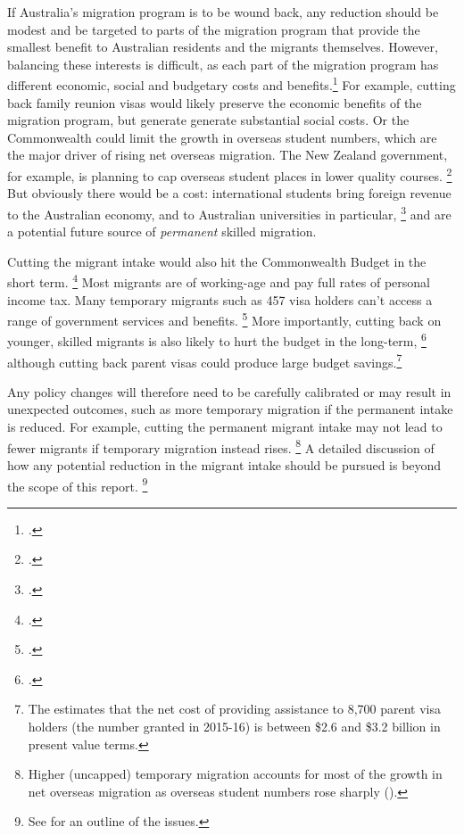 If Australia's migration program is to be wound back, any reduction should be modest and be targeted to parts of the migration program that provide the smallest benefit to Australian residents and the migrants themselves.
However, balancing these interests is difficult, as each part of the migration program has different economic, social and budgetary costs and benefits.\footcite{Rizvi_2018_immigration_debate_inside_story}
For example, cutting back family reunion visas would likely preserve the economic benefits of the migration program, but generate generate substantial social costs.
Or the Commonwealth could limit the growth in overseas student numbers, which are the major driver of rising net overseas migration.
The New Zealand government, for example, is planning to cap overseas student places in lower quality courses.%
    \footcite{NZ_Labour_2018_immigration}
But obviously there would be a cost: international students bring foreign revenue to the Australian economy, and to Australian universities in particular,%
    \footcite{Norton2015cashnexushow}%
 and are a potential future source of \textit{permanent} skilled migration.

Cutting the migrant intake would also hit the Commonwealth Budget in the short term.%
    \footcite{ABC-2018-Two-senior-ministers-slap-down-Abbott-immigration}    
Most migrants are of working-age and pay full rates of personal income tax. Many temporary migrants such as 457 visa holders can’t access a range of government services and benefits.%
    \footcite{Sherrell20184_57changes}
More importantly, cutting back on younger, skilled migrants is also likely to hurt the budget in the long-term,%
    \footcite[][Figure~9.3]{CommissionMigrantIntake2016}
although cutting back parent visas could produce large budget savings.\footnote{The \textcite[][27]{CommissionMigrantIntake2016} estimates that the net cost of providing assistance to 8,700 parent visa holders (the number granted in 2015-16) is between \$2.6 and \$3.2 billion in present value terms.}

Any policy changes will therefore need to be carefully calibrated or may result in unexpected outcomes, such as more temporary migration if the permanent intake is reduced. For example, cutting the permanent migrant intake may not lead to fewer migrants if temporary migration instead rises.%
    \footnote{Higher (uncapped) temporary migration accounts for most of the growth in net overseas migration as overseas student numbers rose sharply (\textcite{ABC-2018-Two-senior-ministers-slap-down-Abbott-immigration}).}
A detailed discussion of how any potential reduction in the migrant intake should be pursued is beyond the scope of this report.%
    \footnote{See \textcite{Rizvi_2018_immigration_debate_inside_story} for an outline of the issues.}
